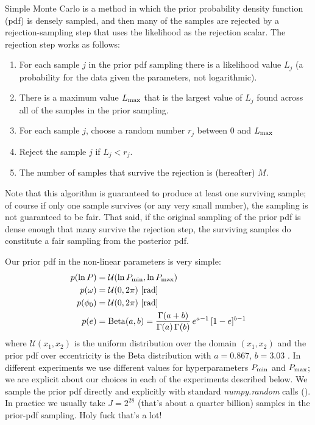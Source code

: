 \documentclass[manuscript, letterpaper]{aastex6}
\newcommand{\project}[1]{\textsl{#1}}
\begin{document}
Simple Monte Carlo is a method in which the prior probability density function
(pdf) is densely sampled, and then many of the samples are rejected by a
rejection-sampling step that uses the likelihood as the rejection scalar.
The rejection step works as follows:
\begin{enumerate}\itemsep0ex
\item For each sample $j$ in the prior pdf sampling there is a
  likelihood value $L_j$ (a probability for the data given the
  parameters, not logarithmic).
\item There is a maximum value $L_{\rm max}$ that is the largest value of
  $L_j$ found across all of the samples in the prior sampling.
\item For each sample $j$, choose a random number $r_j$ between 0 and
  $L_{\rm max}$
\item Reject the sample $j$ if $L_j < r_j$.
\item The number of samples that survive the rejection is (hereafter) $M$.
\end{enumerate}
Note that this algorithm is guaranteed to produce at least one
surviving sample; of course if only one sample survives (or any very
small number), the sampling is not guaranteed to be fair.
That said, if the original sampling of the prior pdf is dense enough
that many survive the rejection step, the surviving samples do
constitute a fair sampling from the posterior pdf.

Our prior pdf in the non-linear parameters is very simple:
\begin{align}
    p(\ln P) &= \mathcal{U}(\ln P_{\rm min}, \ln P_{\rm max})\\
    p(\omega) &= \mathcal{U}(0, 2\pi) ~ [{\rm rad}]\\
    p(\phi_0) &= \mathcal{U}(0, 2\pi) ~ [{\rm rad}]\\
    p(e) &= {\rm Beta}(a, b) = \frac{\Gamma(a+b)}{\Gamma(a) \, \Gamma(b)} \, e^{a-1} \, [1 - e]^{b-1}
\end{align}
where $\mathcal{U}(x_1, x_2)$ is the uniform distribution over the
domain $(x_1, x_2)$ and the prior pdf over eccentricity is the Beta
distribution with $a=0.867$, $b=3.03$ \citep{Kipping:2013}.
In different experiments we use different values for hyperparameters
$P_{\rm min}$ and $P_{\rm max}$; we are explicit about our choices in
each of the experiments described below.
We sample the prior pdf directly and explicitly with standard
\project{numpy.random} calls (\citealt{Van-der-Walt:2011}).
In practice we usually take $J=2^{28}$ (that's about a quarter billion)
samples in the prior-pdf sampling. Holy fuck that's a lot!
\end{document}
